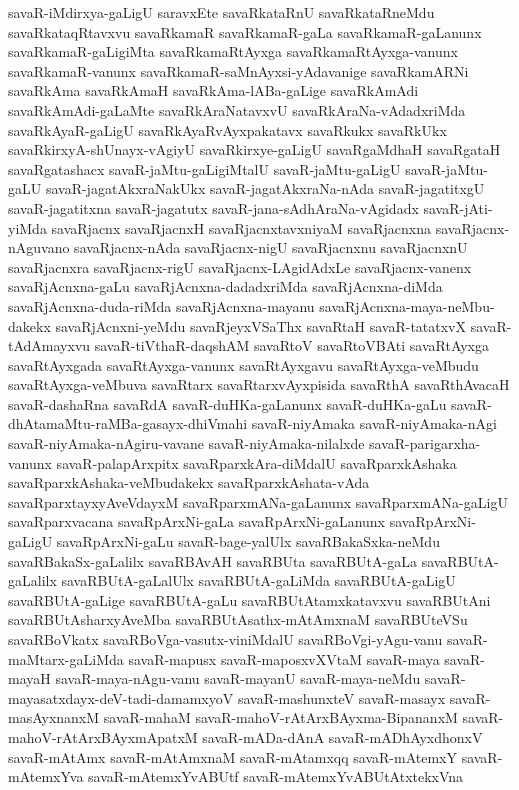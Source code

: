 {savaR-iMdirxya-gaLigU
saravxEte
savaRkataRnU
savaRkataRneMdu
savaRkataqRtavxvu
savaRkamaR
savaRkamaR-gaLa
savaRkamaR-gaLanunx
savaRkamaR-gaLigiMta
savaRkamaRtAyxga
savaRkamaRtAyxga-vanunx
savaRkamaR-vanunx
savaRkamaR-saMnAyxsi-yAdavanige
savaRkamARNi
savaRkAma
savaRkAmaH
savaRkAma-lABa-gaLige
savaRkAmAdi
savaRkAmAdi-gaLaMte
savaRkAraNatavxvU
savaRkAraNa-vAdadxriMda
savaRkAyaR-gaLigU
savaRkAyaRvAyxpakatavx
savaRkukx
savaRkUkx
savaRkirxyA-shUnayx-vAgiyU
savaRkirxye-gaLigU
savaRgaMdhaH
savaRgataH
savaRgatashacx
savaR-jaMtu-gaLigiMtalU
savaR-jaMtu-gaLigU
savaR-jaMtu-gaLU
savaR-jagatAkxraNakUkx
savaR-jagatAkxraNa-nAda
savaR-jagatitxgU
savaR-jagatitxna
savaR-jagatutx
savaR-jana-sAdhAraNa-vAgidadx
savaR-jAti-yiMda
savaRjacnx
savaRjacnxH
savaRjacnxtavxniyaM
savaRjacnxna
savaRjacnx-nAguvano
savaRjacnx-nAda
savaRjacnx-nigU
savaRjacnxnu
savaRjacnxnU
savaRjacnxra
savaRjacnx-rigU
savaRjacnx-LAgidAdxLe
savaRjacnx-vanenx
savaRjAcnxna-gaLu
savaRjAcnxna-dadadxriMda
savaRjAcnxna-diMda
savaRjAcnxna-duda-riMda
savaRjAcnxna-mayanu
savaRjAcnxna-maya-neMbu-dakekx
savaRjAcnxni-yeMdu
savaRjeyxVSaThx
savaRtaH
savaR-tatatxvX
savaR-tAdAmayxvu
savaR-tiVthaR-daqshAM
savaRtoV
savaRtoVBAti
savaRtAyxga
savaRtAyxgada
savaRtAyxga-vanunx
savaRtAyxgavu
savaRtAyxga-veMbudu
savaRtAyxga-veMbuva
savaRtarx
savaRtarxvAyxpisida
savaRthA
savaRthAvacaH
savaR-dashaRna
savaRdA
savaR-duHKa-gaLanunx
savaR-duHKa-gaLu
savaR-dhAtamaMtu-raMBa-gasayx-dhiVmahi
savaR-niyAmaka
savaR-niyAmaka-nAgi
savaR-niyAmaka-nAgiru-vavane
savaR-niyAmaka-nilalxde
savaR-parigarxha-vanunx
savaR-palapArxpitx
savaRparxkAra-diMdalU
savaRparxkAshaka
savaRparxkAshaka-veMbudakekx
savaRparxkAshata-vAda
savaRparxtayxyAveVdayxM
savaRparxmANa-gaLanunx
savaRparxmANa-gaLigU
savaRparxvacana
savaRpArxNi-gaLa
savaRpArxNi-gaLanunx
savaRpArxNi-gaLigU
savaRpArxNi-gaLu
savaR-bage-yalUlx
savaRBakaSxka-neMdu
savaRBakaSx-gaLalilx
savaRBAvAH
savaRBUta
savaRBUtA-gaLa
savaRBUtA-gaLalilx
savaRBUtA-gaLalUlx
savaRBUtA-gaLiMda
savaRBUtA-gaLigU
savaRBUtA-gaLige
savaRBUtA-gaLu
savaRBUtAtamxkatavxvu
savaRBUtAni
savaRBUtAsharxyAveMba
savaRBUtAsathx-mAtAmxnaM
savaRBUteVSu
savaRBoVkatx
savaRBoVga-vasutx-viniMdalU
savaRBoVgi-yAgu-vanu
savaR-maMtarx-gaLiMda
savaR-mapusx
savaR-maposxvXVtaM
savaR-maya
savaR-mayaH
savaR-maya-nAgu-vanu
savaR-mayanU
savaR-maya-neMdu
savaR-mayasatxdayx-deV-tadi-damamxyoV
savaR-mashunxteV
savaR-masayx
savaR-masAyxnanxM
savaR-mahaM
savaR-mahoV-rAtArxBAyxma-BipananxM
savaR-mahoV-rAtArxBAyxmApatxM
savaR-mADa-dAnA
savaR-mADhAyxdhonxV
savaR-mAtAmx
savaR-mAtAmxnaM
savaR-mAtamxqq
savaR-mAtemxY
savaR-mAtemxYva
savaR-mAtemxYvABUtf
savaR-mAtemxYvABUtAtxtekxVna
}

